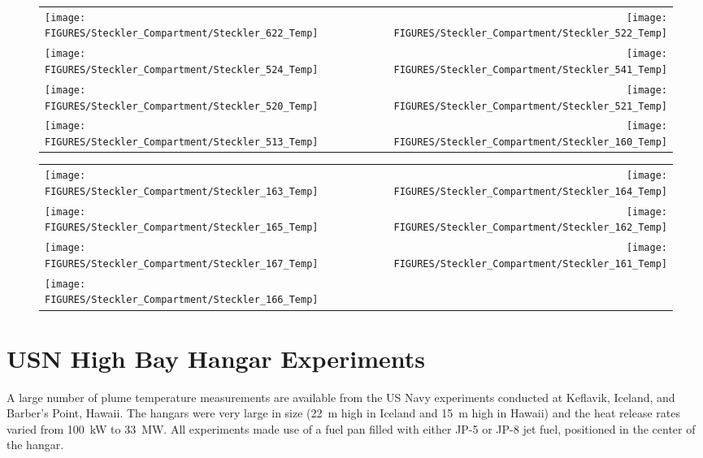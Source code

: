 \begin{figure}[p]
\begin{tabular*}{\textwidth}{l@{\extracolsep{\fill}}r}
\texttt{[image: FIGURES/Steckler\_Compartment/Steckler\_622\_Temp]} &
\texttt{[image: FIGURES/Steckler\_Compartment/Steckler\_522\_Temp]} \\
 \texttt{[image: FIGURES/Steckler\_Compartment/Steckler\_524\_Temp]} &
\texttt{[image: FIGURES/Steckler\_Compartment/Steckler\_541\_Temp]} \\
\texttt{[image: FIGURES/Steckler\_Compartment/Steckler\_520\_Temp]} &
\texttt{[image: FIGURES/Steckler\_Compartment/Steckler\_521\_Temp]} \\
\texttt{[image: FIGURES/Steckler\_Compartment/Steckler\_513\_Temp]} &
\texttt{[image: FIGURES/Steckler\_Compartment/Steckler\_160\_Temp]}
\end{tabular*}
\label{Steckler_Temp_6}
\end{figure}

\begin{figure}[p]
\begin{tabular*}{\textwidth}{l@{\extracolsep{\fill}}r}
\texttt{[image: FIGURES/Steckler\_Compartment/Steckler\_163\_Temp]} &
\texttt{[image: FIGURES/Steckler\_Compartment/Steckler\_164\_Temp]} \\
\texttt{[image: FIGURES/Steckler\_Compartment/Steckler\_165\_Temp]} &
\texttt{[image: FIGURES/Steckler\_Compartment/Steckler\_162\_Temp]} \\
\texttt{[image: FIGURES/Steckler\_Compartment/Steckler\_167\_Temp]} &
\texttt{[image: FIGURES/Steckler\_Compartment/Steckler\_161\_Temp]} \\
\texttt{[image: FIGURES/Steckler\_Compartment/Steckler\_166\_Temp]} &
\end{tabular*}
\label{Steckler_Temp_7}
\end{figure}

\clearpage


\section{USN High Bay Hangar Experiments}

\label{USN_Plume}

A large number of plume temperature measurements are available from the US Navy experiments conducted at Keflavik, Iceland, and Barber's Point, Hawaii. The hangars were very large in size (22~m high in Iceland and 15~m high in Hawaii) and the heat release rates varied from 100~kW to 33~MW. All experiments made use of a fuel pan filled with either JP-5 or JP-8 jet fuel, positioned in the center of the hangar.


